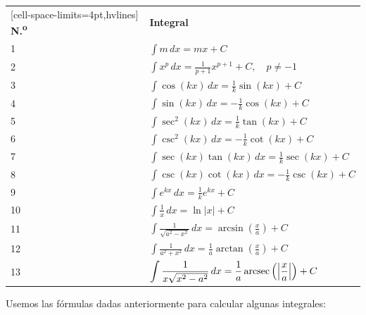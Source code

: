 \begin{center}\label{TablaIntegrales}
  \begin{NiceTabular}{w{c}{0.8cm}w{c}{8cm}}[cell-space-limits=4pt,hvlines]
    \textbf{N.\textsuperscript{o}} & \textbf{Integral} \\
    1 & $\displaystyle\int m\,dx = mx + C$ \\
    2 & $\displaystyle\int x^{p}\,dx = \frac{1}{p+1}x^{p+1}+C,
    \quad p\neq -1$ \\
    3 & $\displaystyle\int \cos(kx)\,dx = \frac{1}{k}\sin(kx)+C$ \\
    4 & $\displaystyle\int \sin(kx)\,dx = -\frac{1}{k}\cos(kx)+C$ \\
    5 & $\displaystyle\int \sec^{2}(kx)\,dx = \frac{1}{k}\tan(kx)+C$ \\
    6 & $\displaystyle\int \csc^{2}(kx)\,dx = -\frac{1}{k}\cot(kx)+C$ \\
    7 & $\displaystyle\int \sec(kx)\tan(kx)\,dx = \frac{1}{k}\sec(kx)+C$ \\
    8 & $\displaystyle\int \csc(kx)\cot(kx)\,dx = -\frac{1}{k}\csc(kx)+C$ \\
    9 & $\displaystyle\int e^{kx}\,dx = \frac{1}{k}e^{kx}+C$ \\
    10 & $\displaystyle\int \frac{1}{x}\,dx = \ln|x|+C$ \\
    11 & $\displaystyle\int \frac{1}{\sqrt{a^{2}-x^{2}}}\,dx = \arcsin\left(\frac{x}{a}\right)+C$ \\
    12 & $\displaystyle\int \frac{1}{a^{2}+x^{2}}\,dx = \frac{1}{a}\arctan\left(\frac{x}{a}\right)+C$ \\
    13 & $\displaystyle\int \frac{1}{x\sqrt{x^{2}-a^{2}}}\,dx = \frac{1}{a}\arcsec\left(\left|\frac{x}{a}\right|\right)+C$ \\
  \end{NiceTabular}
\end{center}

\vspace{\baselineskip}

\begin{ejemplo}
  Usemos las fórmulas dadas anteriormente para calcular algunas integrales:
\end{ejemplo}

